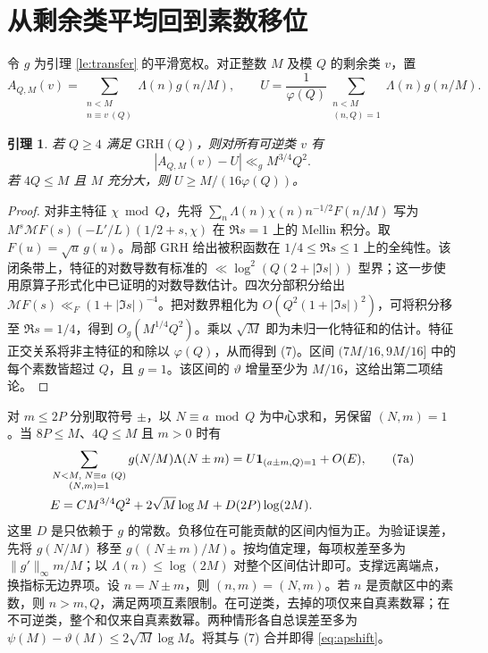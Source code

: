 \documentclass[UTF8,a4paper,11pt,fontset=windows]{ctexart}
\newtheorem{lemma}[theorem]{引理}
\newcommand{\Lam}{\Lambda}
\newcommand{\ind}{\mathbf 1}
\newcommand{\GRH}{\mathrm{GRH}}
\begin{document}
\section{从剩余类平均回到素数移位}
令 \(g\) 为引理 \ref{le:transfer} 的平滑宽权。对正整数 \(M\) 及模 \(Q\) 的剩余类 \(v\)，置
\[
 A_{Q,M}(v)=\sum_{\substack{n<M\\n\equiv v\ (Q)}}\Lam(n)g(n/M),
 \qquad U=\frac{1}{\varphi(Q)}
       \sum_{\substack{n<M\\(n,Q)=1}}\Lam(n)g(n/M).
\]
\begin{lemma}\label{le:ap}
若 \(Q\ge4\) 满足 \(\GRH(Q)\)，则对所有可逆类 \(v\) 有
\[
                  |A_{Q,M}(v)-U|\ll_g M^{3/4}Q^2.            \tag{7}
\]
若 \(4Q\le M\) 且 \(M\) 充分大，则 \(U\ge M/(16\varphi(Q))\)。
\end{lemma}
\begin{proof}
对非主特征 \(\chi\bmod Q\)，先将
\(\sum_n\Lam(n)\chi(n)n^{-1/2}F(n/M)\) 写为
\(M^s\mathcal MF(s)(-L'/L)(1/2+s,\chi)\) 在 \(\Re s=1\) 上的 Mellin 积分。取 \(F(u)=\sqrt{u}\,g(u)\)。局部 GRH 给出被积函数在 \(1/4\le\Re s\le1\) 上的全纯性。该闭条带上，特征的对数导数有标准的 \(\ll\log^2(Q(2+|\Im s|))\) 型界；这一步使用原算子形式化中已证明的对数导数估计。四次分部积分给出 \(\mathcal MF(s)\ll_F(1+|\Im s|)^{-4}\)。把对数界粗化为 \(O(Q^2(1+|\Im s|)^2)\)，可将积分移至 \(\Re s=1/4\)，得到 \(O_g(M^{1/4}Q^2)\)。乘以 \(\sqrt M\) 即为未归一化特征和的估计。特征正交关系将非主特征的和除以 \(\varphi(Q)\)，从而得到 (7)。区间 \((7M/16,9M/16]\) 中的每个素数皆超过 \(Q\)，且 \(g=1\)。该区间的 \(\vartheta\) 增量至少为 \(M/16\)，这给出第二项结论。
\end{proof}

对 \(m\le2P\) 分别取符号 \(\pm\)，以 \(N\equiv a\bmod Q\) 为中心求和，另保留 \((N,m)=1\)。当 \(8P\le M\)、\(4Q\le M\) 且 \(m>0\) 时有
\begin{align}
 &\sum_{\substack{N<M,\;N\equiv a\ (Q)\\(N,m)=1}}
            g(N/M)\Lam(N\pm m)
       = U\ind_{(a\pm m,Q)=1}+O(E),                          \tag{7a}\label{eq:apshift}\\
 &E=C M^{3/4}Q^2+2\sqrt M\log M+D(2P)\log(2M). \notag
\end{align}
这里 \(D\) 是只依赖于 \(g\) 的常数。负移位在可能贡献的区间内恒为正。为验证误差，先将 \(g(N/M)\) 移至 \(g((N\pm m)/M)\)。按均值定理，每项权差至多为 \(\|g'\|_\infty m/M\)；以 \(\Lam(n)\le\log(2M)\) 对整个区间估计即可。支撑远离端点，换指标无边界项。设 \(n=N\pm m\)，则 \((n,m)=(N,m)\)。若 \(n\) 是贡献区中的素数，则 \(n>m,Q\)，满足两项互素限制。在可逆类，去掉的项仅来自真素数幂；在不可逆类，整个和仅来自真素数幂。两种情形各自总误差至多为 \(\psi(M)-\vartheta(M)\le2\sqrt M\log M\)。将其与 (7) 合并即得 \eqref{eq:apshift}。
\end{document}
